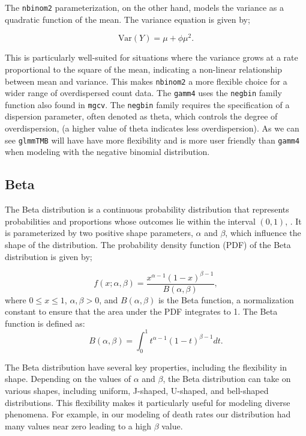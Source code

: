 \documentclass[12pt, twoside,hidelinks]{article}
\theoremstyle{definition}
\numberwithin{equation}{section}
\begin{document}
The \texttt{nbinom2} parameterization, on the other hand, models the variance as a quadratic function of the mean. The variance equation is given by;

\begin{equation}
    \text{Var}(Y) = \mu + \phi \mu^2.
\end{equation}

This is particularly well-suited for situations where the variance grows at a rate proportional to the square of the mean, indicating a non-linear relationship between mean and variance. This makes \texttt{nbinom2} a more flexible choice for a wider range of overdispersed count data.
\newline
The \texttt{gamm4} uses the \texttt{negbin} family function also found in \texttt{mgcv}. The \texttt{negbin} family requires the specification of a dispersion parameter, often denoted as theta, which controls the degree of overdispersion, (a higher value of theta indicates less overdispersion). 
As we can see \texttt{glmmTMB} will have have more flexibility and is more user friendly than \texttt{gamm4} when modeling with the negative binomial distribution.



\subsection{Beta}


The Beta distribution is a continuous probability distribution that represents probabilities and proportions whose outcomes lie within the interval \((0, 1)\), \citep{gupta}. It is parameterized by two positive shape parameters, \(\alpha\) and \(\beta\), which influence the shape of the distribution. The probability density function (PDF) of the Beta distribution is given by;

\begin{equation}
f(x; \alpha, \beta) = \frac{x^{\alpha - 1}(1 - x)^{\beta - 1}}{B(\alpha, \beta)},
\end{equation}
where \(0 \leq x \leq 1\), \(\alpha, \beta > 0\), and \(B(\alpha, \beta)\) is the Beta function, a normalization constant to ensure that the area under the PDF integrates to 1. The Beta function is defined as:
\begin{equation}
B(\alpha, \beta) = \int_0^1 t^{\alpha - 1}(1 - t)^{\beta - 1} dt.
\end{equation}


The Beta distribution have several key properties, including the flexibility in shape. Depending on the values of \(\alpha\) and \(\beta\), the Beta distribution can take on various shapes, including uniform, J-shaped, U-shaped, and bell-shaped distributions. This flexibility makes it particularly useful for modeling diverse phenomena. For example, in our modeling of death rates our distribution had many values near zero leading to a high \(\beta\) value. 
\end{document}
